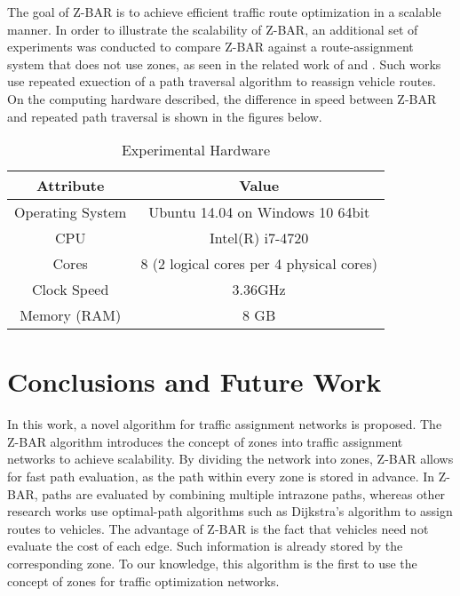 \documentclass[conference]{IEEEtran}
\begin{document}

The goal of Z-BAR is to achieve efficient traffic route optimization in a scalable manner. In order to illustrate the scalability of Z-BAR, an additional set of experiments was conducted to compare Z-BAR against a route-assignment system that does not use zones, as seen in the related work of \cite{iaco} and \cite{dtpos}. Such works use repeated exuection of a path traversal algorithm to reassign vehicle routes. On the computing hardware described, the difference in speed between Z-BAR and repeated path traversal is shown in the figures below.

\begin{table}[H]
\renewcommand{\arraystretch}{1.5}
\caption{Experimental Hardware}
\label{table_example}
\centering

\begin{tabular}{|c|c|}
\hline
Attribute & Value\\
\hline
Operating System & Ubuntu 14.04 on Windows 10 64bit\\
\hline
CPU & Intel(R) i7-4720\\
\hline
Cores & 8 (2 logical cores per 4 physical cores)\\
\hline
Clock Speed & 3.36GHz\\
\hline
Memory (RAM) & 8 GB\\
\hline
\end{tabular}
\end{table}


\section{Conclusions and Future Work} %

In this work, a novel algorithm for traffic assignment networks is proposed. The Z-BAR algorithm introduces the concept of zones into traffic assignment networks to achieve scalability. By dividing the network into zones, Z-BAR allows for fast path evaluation, as the path within every zone is stored in advance. In Z-BAR, paths are evaluated by combining multiple intrazone paths, whereas other research works use optimal-path algorithms such as Dijkstra's algorithm to assign routes to vehicles. The advantage of Z-BAR is the fact that vehicles need not evaluate the cost of each edge. Such information is already stored by the corresponding zone. To our knowledge, this algorithm is the first to use the concept of zones for traffic optimization networks. 
\end{document}
